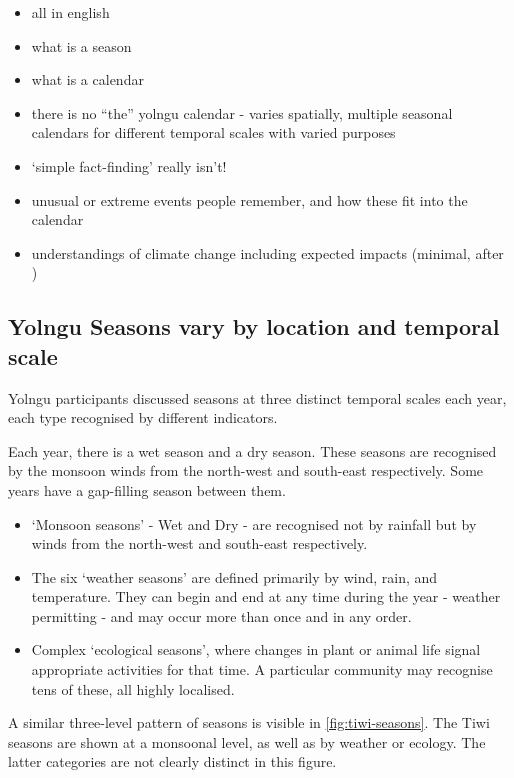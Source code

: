 \begin{itemize}
\item all in english
\item what is a season
\item what is a calendar
\item there is no ``the'' yolngu calendar - varies spatially,
        multiple seasonal calendars for different temporal scales with varied purposes
\item `simple fact-finding' really isn't!
\item unusual or extreme events people remember, and how these fit into the calendar
\item understandings of climate change including expected impacts (minimal, after \citet{petheram2010})
\end{itemize}



\subsection{Yolngu Seasons vary by location and temporal scale}

Yolngu participants discussed seasons at three distinct temporal scales
each year, each type recognised by different indicators.

Each year, there is a wet season and a dry season.  These seasons are
recognised by the monsoon winds from the north-west and south-east
respectively.  Some years have a gap-filling season between them.

\begin{itemize}
\item `Monsoon seasons' - Wet and Dry - are recognised not by rainfall but
        by winds from the north-west and south-east respectively.
\item The six `weather seasons' are defined primarily by wind, rain, and temperature.
        They can begin and end at any time during the year - weather permitting -
        and may occur more than once and in any order.
\item Complex `ecological seasons', where changes in plant or animal life
        signal appropriate activities for that time.  A particular community
        may recognise tens of these, all highly localised.
\end{itemize}

A similar three-level pattern of seasons is visible in \autoref{fig:tiwi-seasons}.
The Tiwi seasons are shown at a monsoonal level, as well as by weather or ecology.
The latter categories are not clearly distinct in this figure.




